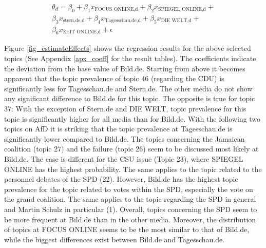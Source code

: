 \documentclass[12pt,a4paper,notitlepage]{article}
\begin{document}
\begin{equation}\label{eq_1}
\begin{split}
	\theta_{d}=\beta_0+\beta_1 x_{\text{FOCUS ONLINE,d}}+\beta_2 x_{\text{SPIEGEL ONLINE,d}}+\\
	\beta_3 x_{\text{stern.de,d}}+\beta_4 x_{\text{Tagesschau.de,d}}+\beta_5 x_{\text{DIE WELT,d}}+\\
	\beta_6 x_{\text{ZEIT ONLINE,d}}+\epsilon
\end{split}
\end{equation}

Figure \ref{fig_estimateEffects} shows the regression results for the above selected topics (See Appendix \ref{apx_coeff} for the result tables). The coefficients indicate the deviation from the base value of Bild.de. Starting from above it becomes apparent that the topic prevalence of topic 46 (regarding the CDU) is significantly less for Tagesschau.de and Stern.de. The other media do not show any significant difference to Bild.de for this topic. The opposite is true for topic 37: With the exception of Stern.de and DIE WELT, topic prevalence for this topic is significantly higher for all media than for Bild.de. With the following two topics on AfD it is striking that the topic prevalence at Tagesschau.de is significantly lower compared to Bild.de. The topics concerning the Jamaican coalition (topic 27) and the failure (topic 26) seem to be discussed most likely at Bild.de. The case is different for the CSU issue (Topic 23), where SPIEGEL ONLINE has the highest probability. The same applies to the topic related to the personnel debates of the SPD (22). However, Bild.de has the highest topic prevalence for the topic related to votes within the SPD, especially the vote on the grand coalition. The same applies to the topic regarding the SPD in general and Martin Schulz in particular (1). Overall, topics concerning the SPD seem to be more frequent at Bild.de than in the other media. Moreover, the distribution of topics at FOCUS ONLINE seems to be the most similar to that of Bild.de, while the biggest differences exist between Bild.de and Tagesschau.de. 
\end{document}

